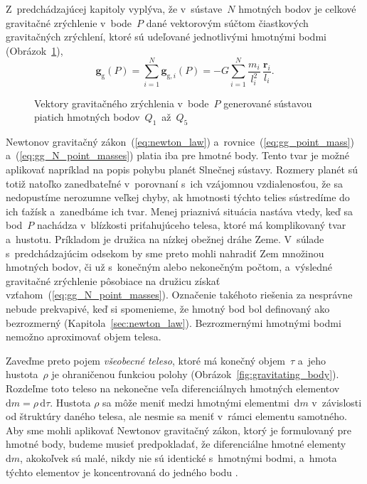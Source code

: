 \documentclass[a4paper,12pt]{book}
\newcommand{\diff}{\mathrm d}
\newcommand{\gidx}{\mathrm g}
\let\vec\mathbf
\begin{document}
Z~predchádzajúcej kapitoly vyplýva, že v~sústave~$N$ hmotných bodov je celkové 
gravitačné zrýchlenie v~bode~$P$ dané vektorovým súčtom čiastkových
gravitačných zrýchlení, ktoré sú udeľované jednotlivými hmotnými bodmi
(Obrázok~\ref{fig:gg_n_point_masses}),
%
\begin{equation}
\label{eq:gg_N_point_masses}
\vec g_\gidx(P) = \sum_{i = 1}^{N}\vec g_{\gidx,i}(P) = -G \sum_{i = 1}^{N}
\frac{m_i}{l_i^2} \, \frac{\vec r_i}{l_i}{.}
\end{equation}

\begin{figure}[b]
\centering

\caption{Vektory gravitačného zrýchlenia v~bode~$P$ generované sústavou piatich
hmotných bodov~$Q_1$~až~$Q_5$}
\label{fig:gg_n_point_masses}
\end{figure}

Newtonov gravitačný zákon~(\ref{eq:newton_law}) 
a~rovnice~(\ref{eq:gg_point_mass}) a~(\ref{eq:gg_N_point_masses}) platia iba 
pre hmotné body.  Tento tvar je možné aplikovať napríklad na popis pohybu 
planét Slnečnej sústavy.  Rozmery planét sú totiž natoľko zanedbateľné 
v~porovnaní s~ich vzájomnou vzdialenosťou, že sa nedopustíme nerozumne veľkej 
chyby, ak hmotnosti týchto telies sústredíme do ich ťažísk a~zanedbáme ich 
tvar.  Menej priaznivá situácia nastáva vtedy, keď sa bod~$P$ nachádza 
v~blízkosti priťahujúceho telesa, ktoré má komplikovaný tvar a~hustotu.  
Príkladom je družica na nízkej obežnej dráhe Zeme.  V~súlade s~predchádzajúcim 
odsekom by sme preto mohli nahradiť Zem množinou hmotných bodov, či už 
s~konečným alebo nekonečným počtom, a~výsledné gravitačné zrýchlenie pôsobiace 
na družicu získať vzťahom~(\ref{eq:gg_N_point_masses}).  Označenie takéhoto 
riešenia za nesprávne nebude prekvapivé, keď si spomenieme, že hmotný bod bol 
definovaný ako bezrozmerný (Kapitola~\ref{sec:newton_law}).  Bezrozmernými 
hmotnými bodmi nemožno aproximovať objem telesa.

Zaveďme preto pojem \emph{všeobecné teleso}, ktoré má konečný objem~$\tau$ 
a~jeho hustota~$\rho$ je ohraničenou funkciou polohy 
(Obrázok~\ref{fig:gravitating_body}).  Rozdeľme toto teleso na nekonečne veľa 
diferenciálnych hmotných elementov~$\diff m = \rho \, \diff \tau$.  Hustota 
$\rho$ sa môže meniť medzi hmotnými elementmi~$\diff m$ v~závislosti od 
štruktúry daného telesa, ale nesmie sa meniť v~rámci elementu samotného.  Aby 
sme mohli aplikovať Newtonov gravitačný zákon, ktorý je formulovaný pre hmotné 
body, budeme musieť predpokladať, že diferenciálne hmotné elementy~$\diff m$, 
akokoľvek sú malé, nikdy nie sú identické s~hmotnými bodmi, a~hmota týchto 
elementov je koncentrovaná do jedného bodu \parencite{Kellogg1967}.
\end{document}
